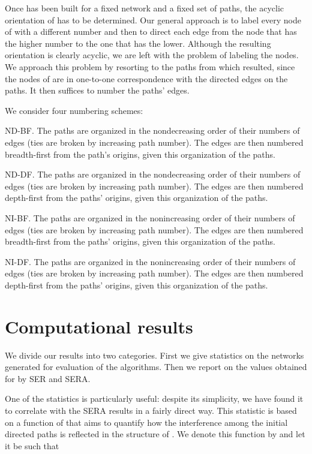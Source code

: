 \documentclass{article}
\begin{document}
Once  has been built for a fixed network and a fixed set of paths, the
acyclic orientation  of  has to be determined. Our general approach
is to label every node of  with a different number and then to direct each
edge from the node that has the higher number to the one that has the lower.
Although the resulting orientation is clearly acyclic, we are left with the
problem of labeling the nodes. We approach this problem by resorting to the
paths  from which 
resulted, since the nodes of  are in one-to-one correspondence with the
directed edges on the paths. It then suffices to number the paths' edges.

We consider four numbering schemes:
\begin{list}{}{}
\item[ND-BF.] The paths are organized in the nondecreasing order of their
numbers of edges (ties are broken by increasing path number). The edges are then
numbered breadth-first from the path's origins, given this organization of the
paths.
\item[ND-DF.] The paths are organized in the nondecreasing order of their
numbers of edges (ties are broken by increasing path number). The edges are then
numbered depth-first from the paths' origins, given this organization of the
paths.
\item[NI-BF.] The paths are organized in the nonincreasing order of their
numbers of edges (ties are broken by increasing path number). The edges are then
numbered breadth-first from the paths' origins, given this organization of the
paths.
\item[NI-DF.] The paths are organized in the nonincreasing order of their
numbers of edges (ties are broken by increasing path number). The edges are then
numbered depth-first from the paths' origins, given this organization of the
paths.
\end{list}

\section{Computational results}\label{sec:results}

We divide our results into two categories. First we give statistics on the
 networks generated for evaluation of the algorithms. Then we report on
the values obtained for  by SER and SERA.

One of the statistics is particularly useful: despite its simplicity, we have
found it to correlate with the SERA results in a fairly direct way. This
statistic is based on a function of  that aims to quantify how the
interference among the initial  directed paths is reflected in the structure
of . We denote this function by  and let it be such that
\end{document}
